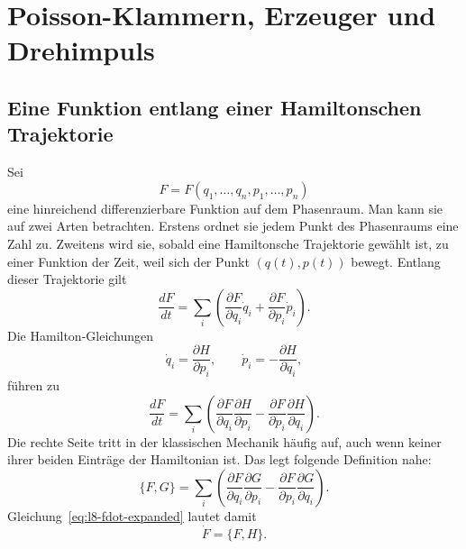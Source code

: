 \chapter{Poisson-Klammern, Erzeuger und Drehimpuls}


\section{Eine Funktion entlang einer Hamiltonschen Trajektorie}

Sei \[
  F=F(q_1,\ldots,q_n,p_1,\ldots,p_n)
\] eine hinreichend differenzierbare Funktion auf dem Phasenraum. Man kann sie auf zwei Arten betrachten. Erstens ordnet sie jedem Punkt des Phasenraums eine Zahl zu. Zweitens wird sie, sobald eine Hamiltonsche Trajektorie gewählt ist, zu einer Funktion der Zeit, weil sich der Punkt \((q(t),p(t))\) bewegt. Entlang dieser Trajektorie gilt \begin{equation}
  \frac{dF}{dt}
  =
  \sum_i\left(
    \frac{\partial F}{\partial q_i}\dot q_i
    +\frac{\partial F}{\partial p_i}\dot p_i
  \right).
  \label{eq:l8-chain-rule}
\end{equation} Die Hamilton-Gleichungen \begin{equation}
  \dot q_i=\frac{\partial H}{\partial p_i},
  \qquad
  \dot p_i=-\frac{\partial H}{\partial q_i},
  \label{eq:l8-hamilton-equations}
\end{equation} führen zu \begin{equation}
  \frac{dF}{dt}
  =
  \sum_i\left(
    \frac{\partial F}{\partial q_i}
    \frac{\partial H}{\partial p_i}
    -
    \frac{\partial F}{\partial p_i}
    \frac{\partial H}{\partial q_i}
  \right).
  \label{eq:l8-fdot-expanded}
\end{equation} Die rechte Seite tritt in der klassischen Mechanik häufig auf, auch wenn keiner ihrer beiden Einträge der Hamiltonian ist. Das legt folgende Definition nahe: \begin{equation}
  \boxed{
  \{F,G\}
  =
  \sum_i\left(
    \frac{\partial F}{\partial q_i}
    \frac{\partial G}{\partial p_i}
    -
    \frac{\partial F}{\partial p_i}
    \frac{\partial G}{\partial q_i}
  \right).}
  \label{eq:l8-poisson-definition}
\end{equation} Gleichung~\eqref{eq:l8-fdot-expanded} lautet damit \begin{equation}
  \boxed{\dot F=\{F,H\}.}
  \label{eq:l8-time-generator}
\end{equation}

